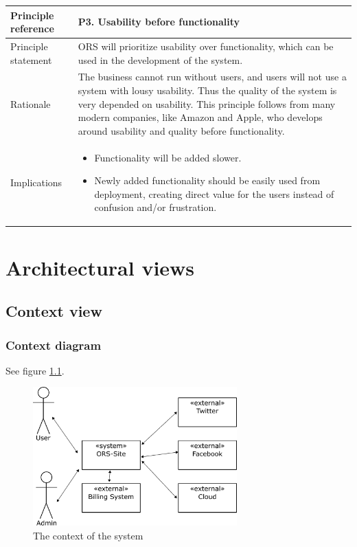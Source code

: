 \documentclass[a4paper,11pt]{report}
\begin{document}
\begin{center}
  \begin{tabular}[h!]{| >{\columncolor{gray}}p{} | p{} |}
    \hline
    Principle reference & P3. Usability before functionality\\
    \hline
    Principle statement & ORS will prioritize usability over functionality, which can be used in the development of the system.\\
    \hline
    Rationale & The business cannot run without users, and users will not use a system with lousy usability. Thus the quality of the system is very depended on usability. This principle follows from many modern companies, like Amazon and Apple, who develops around usability and quality before functionality. \\
    \hline
    Implications & 
      \begin{itemize}
        \item Functionality will be added slower.
        \item Newly added functionality should be easily used from deployment, creating direct value for the users instead of confusion and/or frustration.
      \end{itemize}\\
    \hline
  \end{tabular}
\end{center}


\chapter{Architectural views}
\label{cha:architectural-views}
\thispagestyle{fancy}

\section{Context view}
\label{sec:context-view}



\subsection{Context diagram}
\label{sec:context-diagram}

See figure \ref{fig:context}.

\begin{figure}[h!]
  \centering
  \includegraphics[width=0.7\textwidth]{figures/context_drawing}
  \caption{The context of the system}
  \label{fig:context}
\end{figure}
\end{document}
